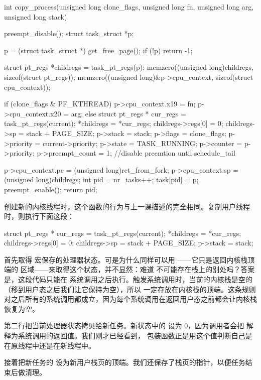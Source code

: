 \begin{ccode}
int copy_process(unsigned long clone_flags, unsigned long fn, unsigned long arg, unsigned long stack)
{
	preempt_disable();
	struct task_struct *p;

	p = (struct task_struct *) get_free_page();
	if (!p) {
		return -1;
	}

	struct pt_regs *childregs = task_pt_regs(p);
	memzero((unsigned long)childregs, sizeof(struct pt_regs));
	memzero((unsigned long)&p->cpu_context, sizeof(struct cpu_context));

	if (clone_flags & PF_KTHREAD) {
		p->cpu_context.x19 = fn;
		p->cpu_context.x20 = arg;
	} else {
		struct pt_regs * cur_regs = task_pt_regs(current);
		*childregs = *cur_regs;
		childregs->regs[0] = 0;
		childregs->sp = stack + PAGE_SIZE;
		p->stack = stack;
	}
	p->flags = clone_flags;
	p->priority = current->priority;
	p->state = TASK_RUNNING;
	p->counter = p->priority;
	p->preempt_count = 1; //disable preemtion until schedule_tail

	p->cpu_context.pc = (unsigned long)ret_from_fork;
	p->cpu_context.sp = (unsigned long)childregs;
	int pid = nr_tasks++;
	task[pid] = p;
	preempt_enable();
	return pid;
}
\end{ccode}

创建新的内核线程时，这个函数的行为与上一课描述的完全相同。复制用户线程时，则执行下面这段：

\begin{ccode}
		struct pt_regs * cur_regs = task_pt_regs(current);
		*childregs = *cur_regs;
		childregs->regs[0] = 0;
		childregs->sp = stack + PAGE_SIZE;
		p->stack = stack;
\end{ccode}

首先取得  宏保存的处理器状态。可是为什么同样可以用 ——它只是返回内核栈顶端的  区域——来取得这个状态，并不显然：难道  不可能存在栈上的别处吗？答案是，这段代码只能在  系统调用之后执行。触发系统调用时，当前的内核栈是空的（移到用户态之后我们让它保持为空），所以  一定存放在内核栈的顶端。这条规则对之后所有的系统调用都成立，因为每个系统调用在返回用户态之前都会让内核栈恢复为空。

第二行把当前处理器状态拷贝给新任务。新状态中的  设为 0，因为调用者会把  解释为系统调用的返回值。我们刚才已经看到， 包装函数正是用这个值判断自己是在原线程中还是在新线程中。

接着把新任务的  设为新用户栈页的顶端。我们还保存了栈页的指针，以便任务结束后做清理。

